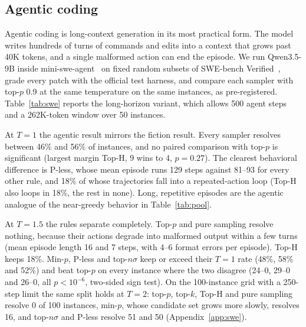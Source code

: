 \documentclass{article}
\newcommand{\pless}{P-less}
\begin{document}
\subsection{Agentic coding}
\label{sec:agentic}

Agentic coding is long-context generation in its most practical form. The model writes hundreds of turns of commands and edits into a context that grows past 40K tokens, and a single malformed action can end the episode. We run Qwen3.5-9B inside mini-swe-agent~\citep{minisweagent,yang2024sweagent} on fixed random subsets of SWE-bench Verified~\citep{jimenez2024swebench}, grade every patch with the official test harness, and compare each sampler with top-$p$ 0.9 at the same temperature on the same instances, as pre-registered. Table~\ref{tab:swe} reports the long-horizon variant, which allows 500 agent steps and a 262K-token window over 50 instances.

\begin{table}[t]
\centering
\caption{\textbf{At $T{=}1$ no sampler beats top-$p$ on long-horizon agentic coding. At $T{=}1.5$ temperature-growing rules break the agent and tight rules do not.} SWE-bench Verified, Qwen3.5-9B, mini-swe-agent with a 500-step limit and 262K context, 50 fixed instances. Resolved: fraction of instances whose patch passes the official tests. W/L: instances resolved by the sampler but not by top-$p$ 0.9 at the same $T$, and the reverse. $^{*}$: two-sided sign test $p<0.05$.}
\label{tab:swe}
\small

\end{table}

At $T{=}1$ the agentic result mirrors the fiction result. Every sampler resolves between 46\% and 56\% of instances, and no paired comparison with top-$p$ is significant (largest margin Top-H, 9 wins to 4, $p{=}0.27$). The clearest behavioral difference is \pless{}, whose mean episode runs 129 steps against 81--93 for every other rule, and 18\% of whose trajectories fall into a repeated-action loop (Top-H also loops in 18\%, the rest in none). Long, repetitive episodes are the agentic analogue of the near-greedy behavior in Table~\ref{tab:pool}.

At $T{=}1.5$ the rules separate completely. Top-$p$ and pure sampling resolve nothing, because their actions degrade into malformed output within a few turns (mean episode length 16 and 7 steps, with 4--6 format errors per episode). Top-H keeps 18\%. Min-$p$, \pless{} and top-$n\sigma$ keep or exceed their $T{=}1$ rate (48\%, 58\% and 52\%) and beat top-$p$ on every instance where the two disagree (24--0, 29--0 and 26--0, all $p<10^{-6}$, two-sided sign test). On the 100-instance grid with a 250-step limit the same split holds at $T{=}2$: top-$p$, top-$k$, Top-H and pure sampling resolve 0 of 100 instances, min-$p$, whose candidate set grows more slowly, resolves 16, and top-$n\sigma$ and \pless{} resolve 51 and 50 (Appendix~\ref{app:swe}).
\end{document}
